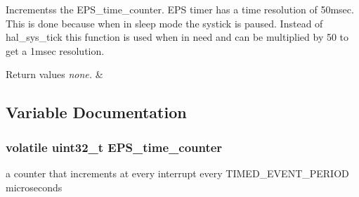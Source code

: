 Incrementss the E\-P\-S\-\_\-time\-\_\-counter. E\-P\-S timer has a time resolution of 50msec. This is done because when in sleep mode the systick is paused. Instead of hal\-\_\-sys\-\_\-tick this function is used when in need and can be multiplied by 50 to get a 1msec resolution. 


\begin{DoxyRetVals}{Return values}
{\em none.} & \\
\hline
\end{DoxyRetVals}


\subsection{Variable Documentation}
\hypertarget{group__eps__time_ga7ecc06961ad259810b3ffa53c5425300}{
\subsubsection[{E\-P\-S\-\_\-time\-\_\-counter}]{\setlength{\rightskip}{0pt plus 5cm}volatile uint32\-\_\-t E\-P\-S\-\_\-time\-\_\-counter}}\label{group__eps__time_ga7ecc06961ad259810b3ffa53c5425300}
a counter that increments at every interrupt every T\-I\-M\-E\-D\-\_\-\-E\-V\-E\-N\-T\-\_\-\-P\-E\-R\-I\-O\-D microseconds 